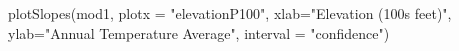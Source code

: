 \begin{Schunk}
\begin{Sinput}
 plotSlopes(mod1, plotx = "elevationP100", xlab="Elevation (100s feet)", ylab="Annual Temperature Average", interval = "confidence")
\end{Sinput}
\end{Schunk}

